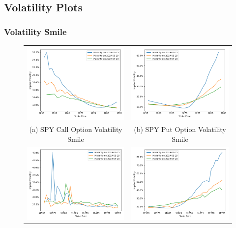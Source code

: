 \documentclass[10pt]{article}
\begin{document}
    \subsection{Volatility Plots}
        \subsubsection{Volatility Smile}
        
        \begin{figure}
            \begin{tabular}{|c|c|}
                \hline
                \includegraphics[width=.47\textwidth]{bin/vol_smile/SPY_Call_2DVolSmile.png} &
                \includegraphics[width=.47\textwidth]{bin/vol_smile/SPY_Put_2DVolSmile.png} \\
                (a) SPY Call Option Volatility Smile &
                (b) SPY Put Option Volatility Smile \\
                \hline
                \includegraphics[width=.47\textwidth]{bin/vol_smile/AMZN_Call_2DVolSmile.png} &
                \includegraphics[width=.47\textwidth]{bin/vol_smile/AMZN_Put_2DVolSmile.png} \\

\end{tabular}
\end{figure}
\end{document}
